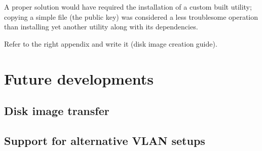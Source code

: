 A proper solution would have required the installation of a custom built utility; copying a simple file (the public key) was considered a less troublesome operation than installing yet another utility along with its dependencies.


\begin{todo}
Refer to the right appendix and write it (disk image creation guide).
\end{todo}


\section{Future developments}

\subsection{Disk image transfer}

\subsection{Support for alternative VLAN setups}

